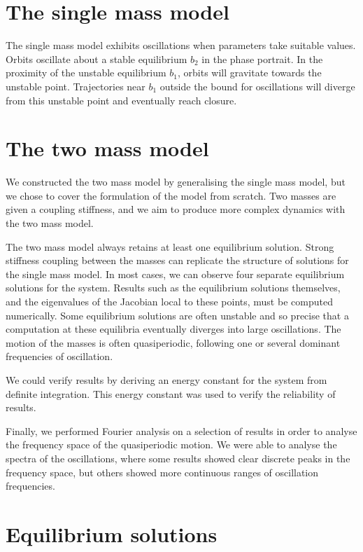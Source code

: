\documentclass{report}
\begin{document}
\section{The single mass model}

The single mass model exhibits oscillations when parameters take suitable values.
Orbits oscillate about a stable equilibrium $b_2$ in the phase portrait.
In the proximity of the unstable equilibrium $b_1$,
orbits will gravitate towards the unstable point.
Trajectories near $b_1$ outside the bound for oscillations will diverge from this unstable point and eventually reach closure.

\section{The two mass model}

We constructed the two mass model by generalising the single mass model,
but we chose to cover the formulation of the model from scratch.
Two masses are given a coupling stiffness,
and we aim to produce more complex dynamics with the two mass model.

The two mass model always retains at least one equilibrium solution.
Strong stiffness coupling between the masses can replicate the structure of solutions for the single mass model.
In most cases,
we can observe four separate equilibrium solutions for the system.
Results such as the equilibrium solutions themselves, and the eigenvalues of the Jacobian local to these points,
must be computed numerically.
Some equilibrium solutions are often unstable and so precise that a computation at these equilibria eventually diverges into large oscillations.
The motion of the masses is often quasiperiodic,
following one or several dominant frequencies of oscillation.

We could verify results by deriving an energy constant for the system from definite integration.
This energy constant was used to verify the reliability of results.

Finally, we performed Fourier analysis on a selection of results in order to analyse the frequency space of the quasiperiodic motion.
We were able to analyse the spectra of the oscillations,
where some results showed clear discrete peaks in the frequency space,
but others showed more continuous ranges of oscillation frequencies.

\section{Equilibrium solutions}
\end{document}
